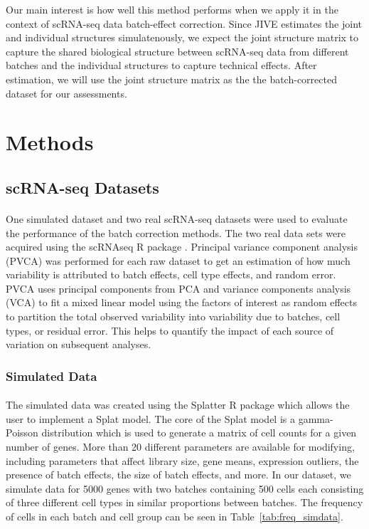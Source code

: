 \documentclass[unnumsec,webpdf,contemporary,large]{oup-authoring-template}%
\theoremstyle{thmstyleone}%
\theoremstyle{thmstyletwo}%
\theoremstyle{thmstylethree}%
\begin{document}
Our main interest is how well this method performs when we apply it in the context of scRNA-seq data batch-effect correction. Since JIVE estimates the joint and individual structures simulatenously, we expect the joint structure matrix to capture the shared biological structure between scRNA-seq data from different batches and the individual structures to capture technical effects. After estimation, we will use the joint structure matrix as the the batch-corrected dataset for our assessments.

\section{Methods}

\subsection{scRNA-seq Datasets}

\paragraph*{}
One simulated dataset and two real scRNA-seq datasets were used to evaluate the performance of the batch correction methods. The two real data sets were acquired using the scRNAseq R package \citep{risso2022scRNAseq}. Principal variance component analysis (PVCA) \citep{li2009principal} was performed for each raw dataset to get an estimation of how much variability is attributed to batch effects, cell type effects, and random error. PVCA uses principal components from PCA and variance components analysis (VCA) to fit a mixed linear model using the factors of interest as random effects to partition the total observed variability into variability due to batches, cell types, or residual error. This helps to quantify the impact of each source of variation on subsequent analyses.

\subsubsection*{Simulated Data}

\paragraph*{}
The simulated data was created using the Splatter R package \citep{zappia2017splatter} which allows the user to implement a Splat model. The core of the Splat model is a gamma-Poisson distribution which is used to generate a matrix of cell counts for a given number of genes. More than 20 different parameters are available for modifying, including parameters that affect library size, gene means, expression outliers, the presence of batch effects, the size of batch effects, and more. In our dataset, we simulate data for 5000 genes with two batches containing 500 cells each consisting of three different cell types in similar proportions between batches. The frequency of cells in each batch and cell group can be seen in Table~\ref{tab:freq_simdata}.
\end{document}
